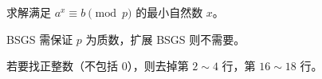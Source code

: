 求解满足 $a^x\equiv b \pmod{p}$ 的最小自然数 $x$。

BSGS 需保证 $p$ 为质数，扩展 BSGS 则不需要。

若要找正整数（不包括 $0$），则去掉第 $2\sim 4$ 行，第 $16\sim 18$ 行。